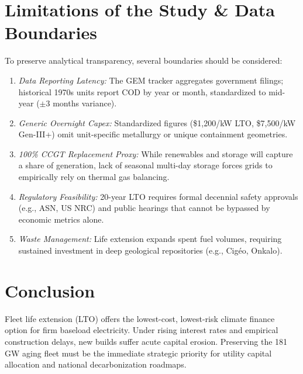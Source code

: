 \documentclass[10pt, twocolumn, a4paper]{article}
\begin{document}
\section{Limitations of the Study \& Data Boundaries}
To preserve analytical transparency, several boundaries should be considered:
\begin{enumerate}
    \item \textit{Data Reporting Latency:} The GEM tracker aggregates government filings; historical 1970s units report COD by year or month, standardized to mid-year ($\pm 3$ months variance).
    \item \textit{Generic Overnight Capex:} Standardized figures (\$1,200/kW LTO, \$7,500/kW Gen-III+) omit unit-specific metallurgy or unique containment geometries.
    \item \textit{100\% CCGT Replacement Proxy:} While renewables and storage will capture a share of generation, lack of seasonal multi-day storage forces grids to empirically rely on thermal gas balancing.
    \item \textit{Regulatory Feasibility:} 20-year LTO requires formal decennial safety approvals (e.g., ASN, US NRC) and public hearings that cannot be bypassed by economic metrics alone.
    \item \textit{Waste Management:} Life extension expands spent fuel volumes, requiring sustained investment in deep geological repositories (e.g., Cig{\'e}o, Onkalo).
\end{enumerate}

\section{Conclusion}
Fleet life extension (LTO) offers the lowest-cost, lowest-risk climate finance option for firm baseload electricity. Under rising interest rates and empirical construction delays, new builds suffer acute capital erosion. Preserving the 181\,GW aging fleet must be the immediate strategic priority for utility capital allocation and national decarbonization roadmaps.



\end{document}
